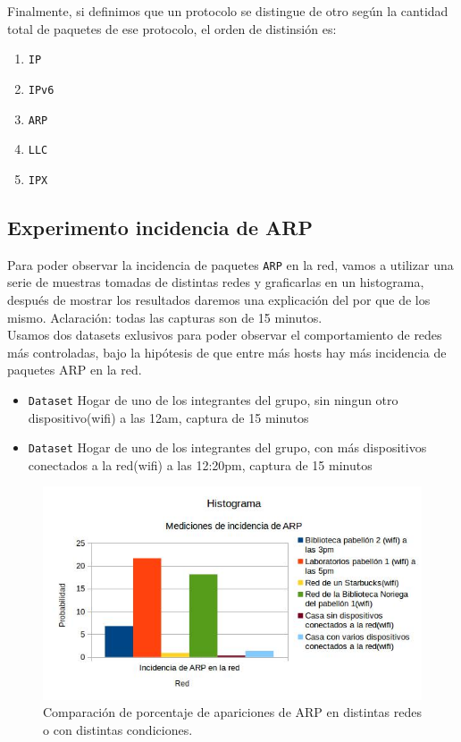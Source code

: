 Finalmente, si definimos que un protocolo se distingue de otro según la cantidad total de paquetes de ese protocolo, el orden de distinsión es:

\begin{enumerate}
\item \texttt{IP}
\item \texttt{IPv6}
\item \texttt{ARP}
\item \texttt{LLC}
\item \texttt{IPX}
\end{enumerate}


\subsection{Experimento incidencia de ARP}

Para poder observar la incidencia de paquetes \texttt{ARP} en la red, vamos a utilizar una serie de muestras tomadas de distintas redes y graficarlas en un histograma, 
después de mostrar los resultados daremos una explicación del por que de los mismo. Aclaración: todas las capturas son de 15 minutos.\\

Usamos dos datasets exlusivos para poder observar el comportamiento de redes más controladas, bajo la hipótesis de que entre más hosts hay más incidencia de paquetes ARP 
en la red.\\

\begin{itemize}
\item \texttt{Dataset} Hogar de uno de los integrantes del grupo, sin ningun otro dispositivo(wifi) a las 12am, captura de 15 minutos
\item \texttt{Dataset} Hogar de uno de los integrantes del grupo, con más dispositivos conectados a la red(wifi) a las 12:20pm, captura de 15 minutos
\end{itemize}

\begin{figure}[H]
\centering
\includegraphics[width=150mm]{imagenes/IncidenciaARP.jpg}
\caption{Comparación de porcentaje de apariciones de ARP en distintas redes o con distintas condiciones.\label{overflow}}
\end{figure}

